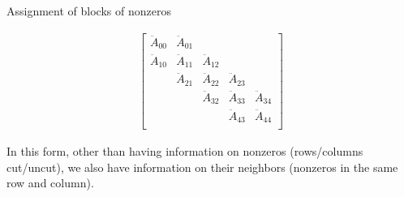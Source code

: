 \begin{frame}{Assignment of blocks of nonzeros}
\begin{minipage}{4cm}
{	\begin{align*}
	\begin{bmatrix}
		\ddot{A}_{00} & \ddot{A}_{01} & & & \\
		\ddot{A}_{10} & \ddot{A}_{11} & \ddot{A}_{12} & & \\
		& \ddot{A}_{21} & \ddot{A}_{22} & \ddot{A}_{23} & \\
		& & \ddot{A}_{32} & \ddot{A}_{33} & \ddot{A}_{34} \\
		& & & \ddot{A}_{43} & \ddot{A}_{44} \\
	\end{bmatrix}
\end{align*}
}

\end{minipage}

\vspace{0.4cm}

In this form, other than having information on nonzeros (rows/columns cut/uncut), we also have information on their neighbors (nonzeros in the same row and column).

\end{frame}


